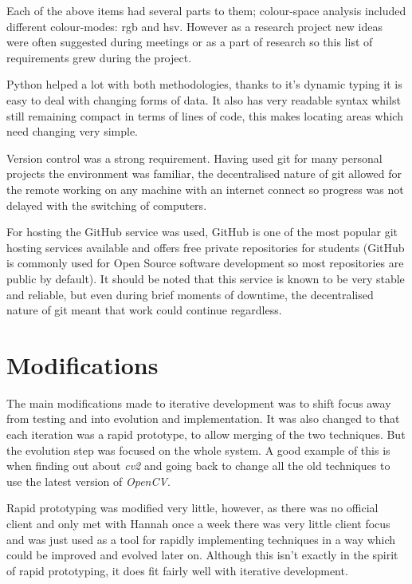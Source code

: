 Each of the above items had several parts to them; colour-space analysis included different 
colour-modes: \gls{rgb} and \gls{hsv}. However as a research project new ideas were often 
suggested during meetings or as a part of research so this list of requirements grew during the
project.

Python helped a lot with both methodologies, thanks to it's dynamic typing it is easy to deal with
changing forms of data. It also has very readable syntax whilst still remaining compact in terms
of lines of code, this makes locating areas which need changing very simple.

Version control was a strong requirement. Having used git for many personal projects the 
environment was familiar, the decentralised nature of git allowed for the remote working on any
machine with an internet connect so progress was not delayed with the switching of computers.

For hosting the GitHub service was used, GitHub is one of the most popular git hosting services
available and offers free private repositories for students (GitHub is commonly used for Open 
Source software development so most repositories are public by default). It should be noted that
this service is known to be very stable and reliable, but even during brief moments of downtime,
the decentralised nature of git meant that work could continue regardless.

\section{Modifications}

The main modifications made to iterative development was to shift focus away from testing and into
evolution and implementation. It was also changed to that each iteration was a rapid prototype,
to allow merging of the two techniques. But the evolution step was focused on the whole system.
A good example of this is when finding out about \emph{cv2} and going back to change all the old
techniques to use the latest version of \emph{OpenCV}.

Rapid prototyping was modified very little, however, as there was no official client and only met with
Hannah once a week there was very little client focus and was just used as a tool for rapidly
implementing techniques in a way which could be improved and evolved later on. Although this isn't
exactly in the spirit of rapid prototyping, it does fit fairly well with iterative development.

